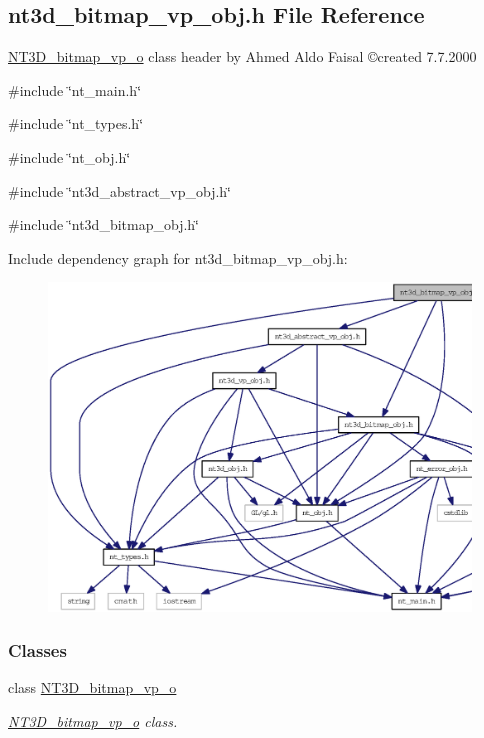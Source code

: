 \subsection{nt3d\_\-bitmap\_\-vp\_\-obj.h File Reference}
\label{nt3d__bitmap__vp__obj_8h}



\begin{DoxyItemize}
\item \hyperlink{class_n_t3_d__bitmap__vp__o}{NT3D\_\-bitmap\_\-vp\_\-o} class header by Ahmed Aldo Faisal \copyright created 7.7.2000 
\end{DoxyItemize} 


{\ttfamily \#include \char`\"{}nt\_\-main.h\char`\"{}}\par
{\ttfamily \#include \char`\"{}nt\_\-types.h\char`\"{}}\par
{\ttfamily \#include \char`\"{}nt\_\-obj.h\char`\"{}}\par
{\ttfamily \#include \char`\"{}nt3d\_\-abstract\_\-vp\_\-obj.h\char`\"{}}\par
{\ttfamily \#include \char`\"{}nt3d\_\-bitmap\_\-obj.h\char`\"{}}\par
Include dependency graph for nt3d\_\-bitmap\_\-vp\_\-obj.h:
\nopagebreak
\begin{figure}[H]
\begin{center}
\leavevmode
\includegraphics[width=400pt]{nt3d__bitmap__vp__obj_8h__incl}
\end{center}
\end{figure}
\subsubsection*{Classes}
\begin{DoxyCompactItemize}
\item 
class \hyperlink{class_n_t3_d__bitmap__vp__o}{NT3D\_\-bitmap\_\-vp\_\-o}
\begin{DoxyCompactList}\small\item\em \hyperlink{class_n_t3_d__bitmap__vp__o}{NT3D\_\-bitmap\_\-vp\_\-o} class. \item\end{DoxyCompactList}\end{DoxyCompactItemize}


